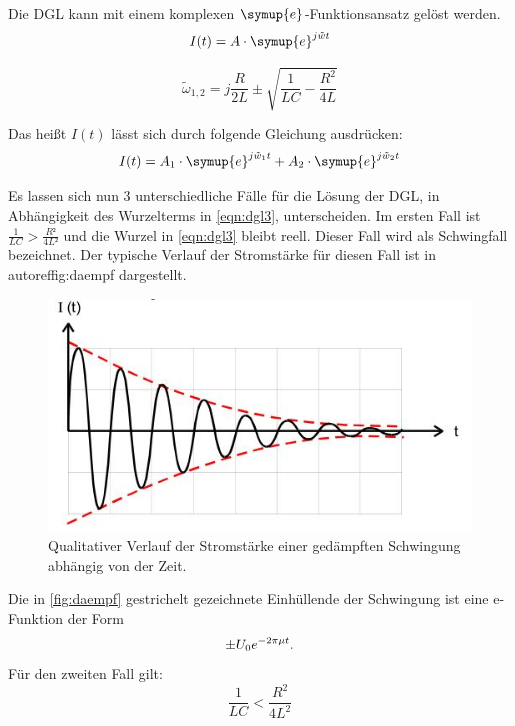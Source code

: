 \noindent Die DGL kann mit einem komplexen $\symup{e}$-Funktionsansatz gelöst werden.
    \begin{equation}
        I(t) = A \cdot \symup{e}^{j \tilde{w} t}
        \label{eqn:dgl2}
    \end{equation}

    \begin{equation}
        \tilde{\omega}_{1,2} = j \frac{R}{2L} \pm \sqrt{\frac{1}{LC}-\frac{R^2}{4L}} 
        \label{eqn:dgl3}
    \end{equation}
    
    \noindent Das heißt $I(t)$ lässt sich durch folgende Gleichung ausdrücken:
    \begin{equation}
        I(t) = A_1 \cdot \symup{e}^{j \tilde{w}_1t} + A_2 \cdot \symup{e}^{j\tilde{w}_2 t} 
    \end{equation}

\noindent Es lassen sich nun 3 unterschiedliche Fälle für die Lösung der DGL, in Abhängigkeit des Wurzelterms in \autoref{eqn:dgl3}, unterscheiden. 
Im ersten Fall ist $\frac{1}{LC} > \frac{R²}{4L²}$ und die Wurzel in \autoref{eqn:dgl3} bleibt reell. Dieser Fall wird als Schwingfall bezeichnet. Der typische Verlauf der Stromstärke für diesen Fall ist in autoref{fig:daempf} dargestellt.
\begin{figure}[H]
    \centering
    \includegraphics{bilder/daempf.jpg}
    \caption{Qualitativer Verlauf der Stromstärke einer gedämpften Schwingung abhängig von der Zeit. \cite{sample}}
    \label{fig:daempf}
  \end{figure}
\noindent
Die in \autoref{fig:daempf} gestrichelt gezeichnete Einhüllende der Schwingung ist eine e-Funktion der Form
\begin{equation*}
    \pm U_0 e^{-2\pi\mu t} \\ \text{.}
    \label{eqn:einh}
\end{equation*}
\noindent
Für den zweiten Fall gilt:
\begin{equation}
    \frac{1}{LC} < \frac{R^2}{4L^2} 
\end{equation}


